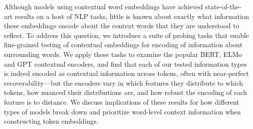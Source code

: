 Although models using contextual word embeddings have achieved state-of-the-art results on a host of NLP tasks, little is known about exactly what information these embeddings encode about the context words that they are understood to reflect. To address this question, we introduce a suite of probing tasks that enable fine-grained testing of contextual embeddings for encoding of information about surrounding words. We apply these tasks to examine the popular BERT, ELMo and GPT contextual encoders, and find that each of our tested information types is indeed encoded as contextual information across tokens, often with near-perfect recoverability---but the encoders vary in which features they distribute to which tokens, how nuanced their distributions are, and how robust the encoding of each feature is to distance. We discuss implications of these results for how different types of models break down and prioritize word-level context information when constructing token embeddings.
